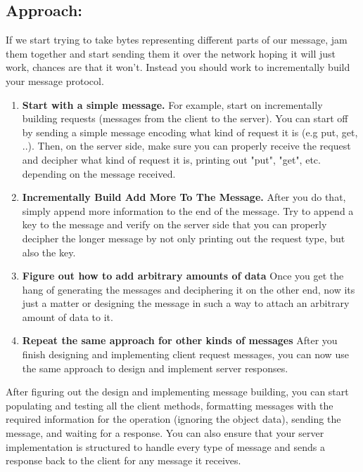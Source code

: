 \documentclass{article}
\begin{document}
\subsection*{Approach:}
If we start trying to take bytes representing different parts of our message, jam them together and start sending them it over the network hoping it will just work, chances are that it won't. Instead you should work to incrementally build your message protocol. \\

\begin{enumerate} 
    \item \textbf{Start with a simple message.} For example, start on incrementally building requests (messages from the client to the server). You can start off by sending a simple message encoding what kind of request it is (e.g put, get, ..). Then, on the server side, make sure you can properly receive the request and decipher what kind of request it is, printing out "put", "get", etc. depending on the message received. \\
    \item \textbf{Incrementally Build Add More To The Message.} After you do that, simply append more information to the end of the message. Try to append a key to the message and verify on the server side that you can properly decipher the longer message by not only printing out the request type, but also the key. \\
    \item \textbf{Figure out how to add arbitrary amounts of data} Once you get the hang of generating the messages and deciphering it on the other end, now its just a matter or designing the message in such a way to attach an arbitrary amount of data to it.\\ 
    \item \textbf{Repeat the same approach for other kinds of messages} After you finish designing and implementing client request messages, you can now use the same approach to design and implement server responses. 
\end{enumerate}

\noindent After figuring out the design and implementing message building, you can start populating and testing all the client methods, formatting messages with the required information for the operation (ignoring the object data), sending the message, and waiting for a response. You can also ensure that your server implementation is structured to handle every type of message and sends a response back to the client for any message it receives. 
\end{document}
